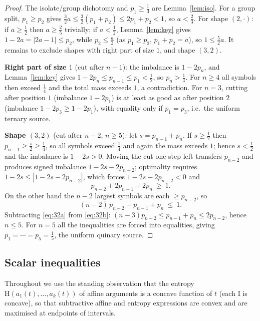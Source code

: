 \documentclass[journal]{IEEEtran}
\theoremstyle{definition}
\begin{document}
\begin{proof}
The isolate/group dichotomy and $p_1\ge\tfrac13$ are Lemma~\ref{lem:iso}. For a
group split, $p_1\ge p_2$ gives $\tfrac32a\le\tfrac32(p_1+p_2)\le2p_1+p_2<1$,
so $a<\tfrac23$. For shape $(2,\cdot)$: if $a\ge\tfrac12$ then $a\ge\tfrac25$
trivially; if $a<\tfrac12$, Lemma~\ref{lem:key} gives $1-2a=|2a-1|\le p_2$,
while $p_2\le\tfrac a2$ (as $p_1\ge p_2$, $p_1+p_2=a$), so $1\le\tfrac52a$. It remains to exclude shapes with right part of size $1$, and shape $(3,2)$.

\textbf{Right part of size $1$} (cut after $n-1$): the imbalance is $1-2p_n$, and
Lemma~\ref{lem:key} gives $1-2p_n\le p_{n-1}\le p_1<\tfrac12$, so
$p_n>\tfrac14$. For $n\ge4$ all symbols then exceed $\tfrac14$ and the total mass
exceeds $1$, a contradiction. For $n=3$, cutting after position $1$ (imbalance
$1-2p_1$) is at least as good as after position $2$ (imbalance $1-2p_3\ge1-2p_1$),
with equality only if $p_1=p_3$, i.e.\ the uniform ternary source.

\textbf{Shape $(3,2)$} (cut after $n-2$, $n\ge5$): let $s=p_{n-1}+p_n$. If
$s\ge\tfrac12$ then $p_{n-1}\ge\tfrac s2\ge\tfrac14$, so all symbols exceed
$\tfrac14$ and again the mass exceeds $1$; hence $s<\tfrac12$ and the imbalance
is $1-2s>0$. Moving the cut one step left transfers $p_{n-2}$ and produces
signed imbalance $1-2s-2p_{n-2}$; optimality requires
$1-2s\le|1-2s-2p_{n-2}|$, which forces $1-2s-2p_{n-2}<0$ and
\begin{equation}\label{eq:32a}
  p_{n-2}+2p_{n-1}+2p_n\ \ge\ 1 .
\end{equation}
On the other hand the $n-2$ largest symbols are each $\ge p_{n-2}$, so
\begin{equation}\label{eq:32b}
  (n-2)\,p_{n-2}+p_{n-1}+p_n\ \le\ 1 .
\end{equation}
Subtracting \eqref{eq:32a} from \eqref{eq:32b}:
$(n-3)p_{n-2}\le p_{n-1}+p_n\le2p_{n-2}$, hence $n\le5$. For $n=5$ all the
inequalities are forced into equalities, giving $p_1=\cdots=p_5=\tfrac15$, the
uniform quinary source.
\end{proof}

\subsection{Scalar inequalities}

Throughout we use the standing observation that the entropy
$\mathrm H(a_1(t),\dots,a_k(t))$ of affine arguments is a concave
function of $t$ (each $\mathrm I$ is concave), so that subtractive
affine and entropy expressions are convex and are maximised at endpoints of
intervals.
\end{document}

